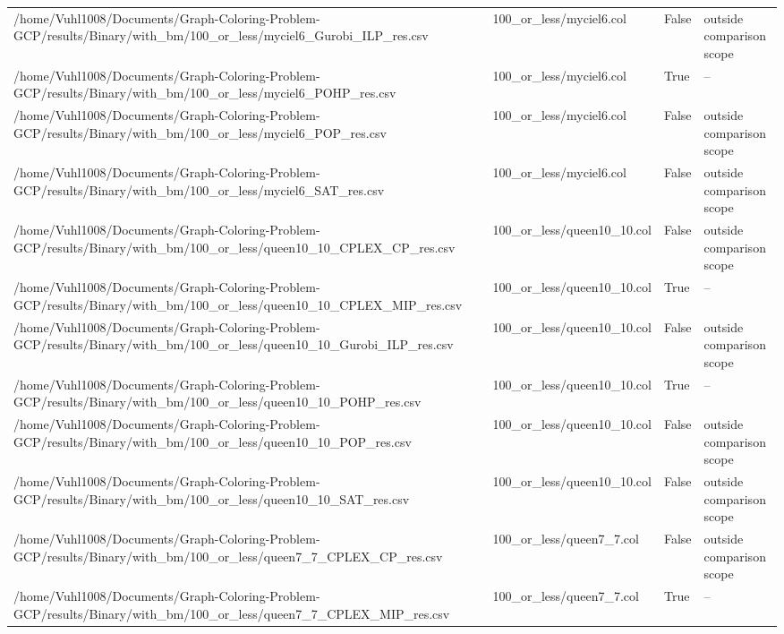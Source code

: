 \begin{table}[htbp]
\begin{tabular}{llll}
/home/Vuhl1008/Documents/Graph-Coloring-Problem-GCP/results/Binary/with\_bm/100\_or\_less/myciel6\_Gurobi\_ILP\_res.csv & 100\_or\_less/myciel6.col & False & outside comparison scope \\
/home/Vuhl1008/Documents/Graph-Coloring-Problem-GCP/results/Binary/with\_bm/100\_or\_less/myciel6\_POHP\_res.csv & 100\_or\_less/myciel6.col & True & -- \\
/home/Vuhl1008/Documents/Graph-Coloring-Problem-GCP/results/Binary/with\_bm/100\_or\_less/myciel6\_POP\_res.csv & 100\_or\_less/myciel6.col & False & outside comparison scope \\
/home/Vuhl1008/Documents/Graph-Coloring-Problem-GCP/results/Binary/with\_bm/100\_or\_less/myciel6\_SAT\_res.csv & 100\_or\_less/myciel6.col & False & outside comparison scope \\
/home/Vuhl1008/Documents/Graph-Coloring-Problem-GCP/results/Binary/with\_bm/100\_or\_less/queen10\_10\_CPLEX\_CP\_res.csv & 100\_or\_less/queen10\_10.col & False & outside comparison scope \\
/home/Vuhl1008/Documents/Graph-Coloring-Problem-GCP/results/Binary/with\_bm/100\_or\_less/queen10\_10\_CPLEX\_MIP\_res.csv & 100\_or\_less/queen10\_10.col & True & -- \\
/home/Vuhl1008/Documents/Graph-Coloring-Problem-GCP/results/Binary/with\_bm/100\_or\_less/queen10\_10\_Gurobi\_ILP\_res.csv & 100\_or\_less/queen10\_10.col & False & outside comparison scope \\
/home/Vuhl1008/Documents/Graph-Coloring-Problem-GCP/results/Binary/with\_bm/100\_or\_less/queen10\_10\_POHP\_res.csv & 100\_or\_less/queen10\_10.col & True & -- \\
/home/Vuhl1008/Documents/Graph-Coloring-Problem-GCP/results/Binary/with\_bm/100\_or\_less/queen10\_10\_POP\_res.csv & 100\_or\_less/queen10\_10.col & False & outside comparison scope \\
/home/Vuhl1008/Documents/Graph-Coloring-Problem-GCP/results/Binary/with\_bm/100\_or\_less/queen10\_10\_SAT\_res.csv & 100\_or\_less/queen10\_10.col & False & outside comparison scope \\
/home/Vuhl1008/Documents/Graph-Coloring-Problem-GCP/results/Binary/with\_bm/100\_or\_less/queen7\_7\_CPLEX\_CP\_res.csv & 100\_or\_less/queen7\_7.col & False & outside comparison scope \\
/home/Vuhl1008/Documents/Graph-Coloring-Problem-GCP/results/Binary/with\_bm/100\_or\_less/queen7\_7\_CPLEX\_MIP\_res.csv & 100\_or\_less/queen7\_7.col & True & -- \\

\end{tabular}
\end{table}
